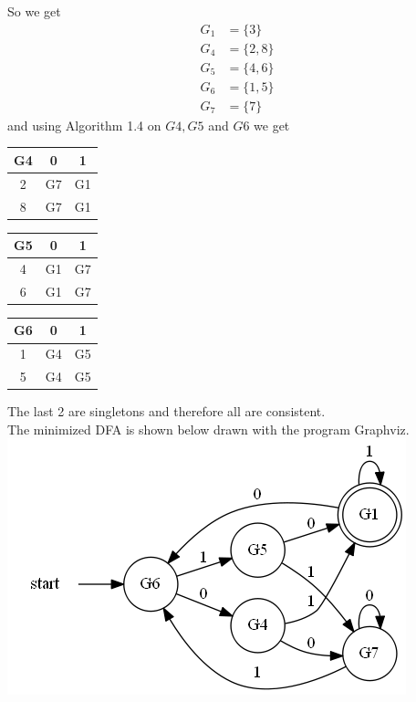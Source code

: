 \documentclass[12pt]{article}
\begin{document}
So we get
\begin{align*}
G_1 &= \{3\}\\
G_4 &= \{2,8\}\\
G_5 &= \{4,6\}\\
G_6 &= \{1,5\}\\
G_7 &= \{7\}
\end{align*}
and using Algorithm 1.4 on $G4, G5$ and $G6$ we get
\begin{center}
\begin{tabular}{|c|c|c|}
\hline 
G4 & 0 & 1 \\ 
\hline 
2 & G7 & G1 \\ 
\hline 
8 & G7 & G1 \\ 
\hline 
\end{tabular}
\end{center}
\begin{center}
\begin{tabular}{|c|c|c|}
\hline 
G5 & 0 & 1 \\ 
\hline 
4 & G1 & G7 \\ 
\hline 
6 & G1 & G7 \\ 
\hline 
\end{tabular}
\end{center}
\begin{center}
\begin{tabular}{|c|c|c|}
\hline 
G6 & 0 & 1 \\ 
\hline 
1 & G4 & G5 \\ 
\hline 
5 & G4 & G5 \\ 
\hline 
\end{tabular}
\end{center}
The last 2 are singletons and therefore all are consistent.\\
The minimized DFA is shown below drawn with the program Graphviz.\\
\includegraphics[scale=0.6]{graph1}
\end{document}
